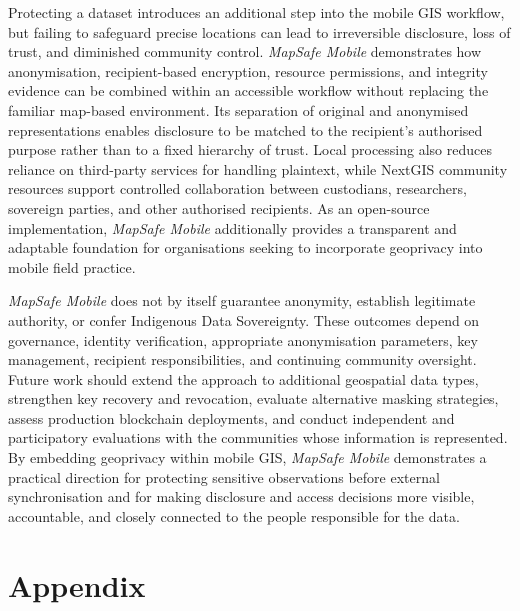 \documentclass[]{interact}
\begin{document}
Protecting a dataset introduces an additional step into the mobile GIS workflow, but failing to safeguard precise locations can lead to irreversible disclosure, loss of trust, and diminished community control. \textit{MapSafe Mobile} demonstrates how anonymisation, recipient-based encryption, resource permissions, and integrity evidence can be combined within an accessible workflow without replacing the familiar map-based environment. Its separation of original and anonymised representations enables disclosure to be matched to the recipient's authorised purpose rather than to a fixed hierarchy of trust. Local processing also reduces reliance on third-party services for handling plaintext, while NextGIS community resources support controlled collaboration between custodians, researchers, sovereign parties, and other authorised recipients. As an open-source implementation, \textit{MapSafe Mobile} additionally provides a transparent and adaptable foundation for organisations seeking to incorporate geoprivacy into mobile field practice.

\textit{MapSafe Mobile} does not by itself guarantee anonymity, establish legitimate authority, or confer Indigenous Data Sovereignty. These outcomes depend on governance, identity verification, appropriate anonymisation parameters, key management, recipient responsibilities, and continuing community oversight. Future work should extend the approach to additional geospatial data types, strengthen key recovery and revocation, evaluate alternative masking strategies, assess production blockchain deployments, and conduct independent and participatory evaluations with the communities whose information is represented. By embedding geoprivacy within mobile GIS, \textit{MapSafe Mobile} demonstrates a practical direction for protecting sensitive observations before external synchronisation and for making disclosure and access decisions more visible, accountable, and closely connected to the people responsible for the data.





\section*{Appendix}
\end{document}
